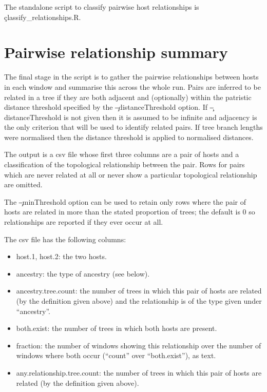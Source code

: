 The standalone script to classify pairwise host relationships is \c{classify\_relationships.R}.

\section{Pairwise relationship summary}\label{sec:ClassificationSummary}

The final stage in the script is to gather the pairwise relationships between hosts in each window and summarise this across the whole run.
Pairs are inferred to be related in a tree if they are both adjacent and (optionally) within the patristic distance threshold specified by the \c{--distanceThreshold} option.
If \c{--distanceThreshold} is not given then it is assumed to be infinite and adjacency is the only criterion that will be used to identify related pairs.
If tree branch lengths were normalised then the distance threshold is applied to normalised distances.

The output is a csv file whose first three columns are a pair of hosts and a classification of the topological relationship between the pair.
Rows for pairs which are never related at all or never show a particular topological relationship are omitted.

The \c{--minThreshold} option can be used to retain only rows where the pair of hosts are related in more than the stated proportion of trees; the default is 0 so relationships are reported if they ever occur at all.

The csv file has the following columns:
\begin{itemize}
\item host.1, host.2: the two hosts.
\item ancestry: the type of ancestry (see below).
\item ancestry.tree.count: the number of trees in which this pair of hosts are related (by the definition given above) and the relationship is of the type given under ``ancestry''.
\item both.exist: the number of trees in which both hosts are present.
\item fraction: the number of windows showing this relationship over the number of windows where both occur (``count'' over ``both.exist''), as text.
\item any.relationship.tree.count: the number of trees in which this pair of hosts are related (by the definition given above).
\end{itemize}

